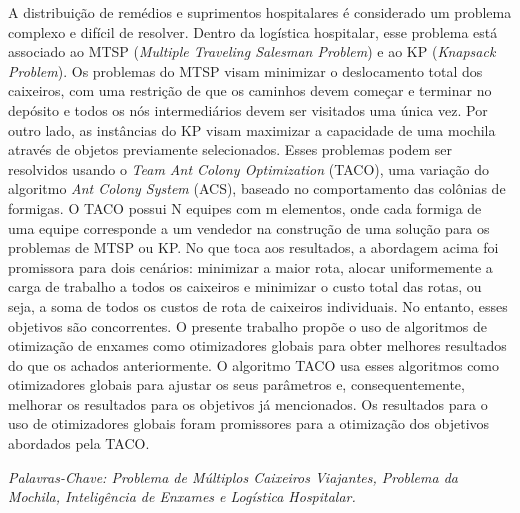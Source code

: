 \setlength{\absparsep}{18pt} %
\begin{resumo}
  A distribuição de remédios e suprimentos hospitalares é considerado um problema complexo e difícil de resolver. Dentro da logística hospitalar, esse problema está associado ao MTSP (\textit{Multiple Traveling Salesman Problem}) e ao KP (\textit{Knapsack Problem}). Os problemas do MTSP visam minimizar o deslocamento total dos caixeiros, com uma restrição de que os caminhos devem começar e terminar no depósito e todos os nós intermediários devem ser visitados uma única vez. Por outro lado, as instâncias do KP visam maximizar a capacidade de uma mochila através de objetos previamente selecionados. Esses problemas podem ser resolvidos usando o \textit{Team Ant Colony Optimization} (TACO), uma variação do algoritmo \textit{Ant Colony System} (ACS), baseado no comportamento das colônias de formigas. O TACO possui N equipes com m elementos, onde cada formiga de uma equipe corresponde a um vendedor na construção de uma solução para os problemas de MTSP ou KP. No que toca aos resultados, a abordagem acima foi promissora para dois cenários: minimizar a maior rota, alocar uniformemente a carga de trabalho a todos os caixeiros e minimizar o custo total das rotas, ou seja, a soma de todos os custos de rota de caixeiros individuais. No entanto, esses objetivos são concorrentes. O presente trabalho propõe o uso de algoritmos de otimização de enxames como otimizadores globais para obter melhores resultados do que os achados anteriormente. O algoritmo TACO usa esses algoritmos como otimizadores globais para ajustar os seus parâmetros e, consequentemente, melhorar os resultados para os objetivos já mencionados. Os resultados para o uso de otimizadores globais foram promissores para a otimização dos objetivos abordados pela TACO.

  \textit{Palavras-Chave: Problema de Múltiplos Caixeiros Viajantes, Problema da Mochila, Inteligência de Enxames e Logística Hospitalar.}

\end{resumo}

